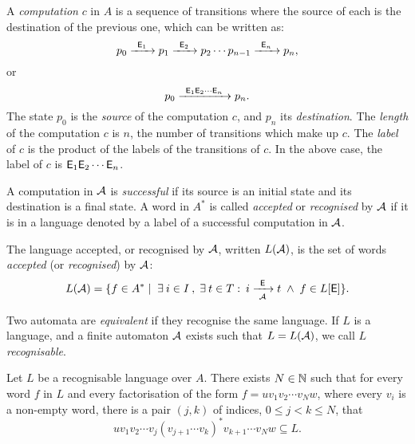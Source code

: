 A \emph{computation} $c$ in $A$ is a sequence of transitions where the source of each is the destination of the previous one, which can be written as:
\[
    p_0 {\; \xrightarrow[]{\: \; {\mathsf{E}}_1 \: \;} \;} p_1 {\; \xrightarrow[]{\: \; {\mathsf{E}}_2 \: \;} \;} p_2 \dotsm p_{n-1} {\; \xrightarrow[]{\: \; {\mathsf{E}}_n \: \;} \;} p_n,
\]
or
\[
    p_0 {\; \xrightarrow[]{\: \; {\mathsf{E}}_1 {\mathsf{E}}_2 \dotsm {\mathsf{E}}_n \: \;} \;} p_n.
\]
The state $p_0$ is the \emph{source} of the computation $c$, and $p_n$ its \emph{destination}. The \emph{length} of the computation $c$ is $n$, the number of transitions which make up $c$. The \emph{label} of $c$ is the product of the labels of the transitions of $c$. In the above case, the label of $c$ is ${\mathsf{E}}_1 {\mathsf{E}}_2 \dotsm {\mathsf{E}}_n$.

A computation in ${\mathcal{A}}$ is \emph{successful} if its source is an initial state and its destination is a final state. A word in $A^*$ is called \emph{accepted} or \emph{recognised} by ${\mathcal{A}}$ if it is in a language denoted by a label of a successful computation in ${\mathcal{A}}$.

\begin{defn}
    The language accepted, or recognised by ${\mathcal{A}}$, written $L({\mathcal{A}})$, is the set of words \emph{accepted} (or \emph{recognised}) by ${\mathcal{A}}$:
    \[
        L({\mathcal{A}}) = \{ f \in A^* \mid \; \exists \: i \in I \: , \; \exists \: t \in T : \: i {\; \xrightarrow[{\mathcal{A}}]{\: \; {\mathsf{E}} \: \;} \;} t \; \wedge \; f \in L[{\mathsf{E}}] \}.
    \]
\end{defn}

Two automata are \emph{equivalent} if they recognise the same language. If $L$ is a language, and a finite automaton ${\mathcal{A}}$ exists such that $L = L({\mathcal{A}})$, we call $L$ \emph{recognisable}.

\begin{lemma}\label{lm:block_star_lemma}
    Let $L$ be a recognisable language over $A$. There exists $N \in \mathbb{N}$ such that for every word $f$ in $L$ and every factorisation of the form $f = u v_1 v_2 \dotsm v_N w$, where every $v_i$ is a non-empty word, there is a pair $(j,k)$ of indices, $0 \leq j < k \leq N$, that
    \[
        u v_1 v_2 \dotsm v_j {(v_{j+1} \dotsm v_k)}^* v_{k+1} \dotsm v_N w \subseteq L.
    \]
\end{lemma}

